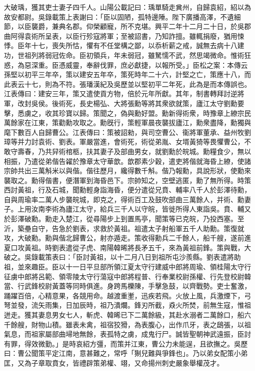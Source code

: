 \begin{pinyinscope}
大破瑀，獲其吏士妻子四千人。山陽公載記曰：瑀單騎走兾州，自歸袁紹，紹以為故安都尉。吳錄載策上表謝曰：「臣以固陋，孤特邊陲。陛下廣播高澤，不遺細節，以臣襲爵，兼典名郡。仰榮顧寵，所不克堪。興平二年十二月二十日，於吳郡曲阿得袁術所呈表，以臣行殄寇將軍；至被詔書，乃知詐擅。雖輒捐廢，猶用悚悸。臣年十七，喪失所怙，懼有不任堂構之鄙，以忝析薪之戒，誠無去病十八建功，世祖列將弱冠佐命。臣初領兵，年未弱冠，雖駑懦不武，然思竭微命。惟術狂惑，為惡深重。臣憑威靈，奉辭伐罪，庶必獻捷，以報所受。」臣松之案：本傳云孫堅以初平三年卒，策以建安五年卒，策死時年二十六，計堅之亡，策應十八，而此表云十七，則為不符。張璠漢紀及吳歷並以堅初平二年死，此為是而本傳誤也。江表傳曰：建安三年，策又遣使貢方物，倍於元年所獻。其年，制書轉拜討逆將軍，改封吳侯。後術死，長史楊弘、大將張勳等將其衆欲就策，廬江太守劉勳要擊，悉虜之，收其珍寶以歸。策聞之，偽與勳好盟。勳新得術衆，時豫章上繚宗民萬餘家在江東，策勸勳攻取之。勳旣行，策輕軍晨夜襲拔廬江，勳衆盡降，勳獨與麾下數百人自歸曹公。江表傳曰：策被詔勑，與司空曹公、衞將軍董承、益州牧劉璋等并力討袁術、劉表。軍嚴當進，會術死，術從弟胤、女壻黃猗等畏懼曹公，不敢守壽春，乃共舁術棺柩，扶其妻子及部曲男女，就劉勳於皖城。勳糧食少，無以相振，乃遣從弟偕告糴於豫章太守華歆。歆郡素少穀，遣吏將偕就海昏上繚，使諸宗帥共出三萬斛米以與偕。偕往歷月，纔得數千斛。偕乃報勳，具說形狀，使勳來襲取之。勳得偕書，便潛軍到海昏邑下。宗帥知之，空壁逃匿，勳了無所得。時策西討黃祖，行及石城，聞勳輕身詣海昏，便分遣從兄賁、輔率八千人於彭澤待勳，自與周瑜率二萬人步襲皖城，即克之，得術百工及鼓吹部曲三萬餘人，并術、勳妻子。上用汝南李術為廬江太守，給兵三千人以守皖，皆徙所得人東詣吳。賁、輔又於彭澤破勳。勳走入楚江，從尋陽步上到置馬亭，聞策等已克皖，乃投西塞。至沂，築壘自守，告急於劉表，求救於黃祖。祖遣太子射船軍五千人助勳。策復就攻，大破勳。勳與偕北歸曹公，射亦遁走。策收得勳兵二千餘人，船千艘，遂前進夏口攻黃祖。時劉表遣從子虎、南陽韓晞將長矛五千，來為黃祖前鋒。策與戰，大破之。吳錄載策表曰：「臣討黃祖，以十二月八日到祖所屯沙羨縣。劉表遣將助祖，並來趣臣。臣以十一日平旦部所領江夏太守行建威中郎將周瑜、領桂陽太守行征虜中郎將呂範、領零陵太守行蕩寇中郎將程普、行奉業校尉孫權、行先登校尉韓當、行武鋒校尉黃蓋等同時俱進。身跨馬櫟陳，手擊急鼓，以齊戰勢。吏士奮激，踊躍百倍，心精意果，各競用命。越渡重壍，迅疾若飛。火放上風，兵激煙下，弓弩並發，流矢雨集，日加辰時，祖乃潰爛。鋒刃所截，猋火所焚，前無生寇，惟祖迸走。獲其妻息男女七人，斬虎、韓晞已下二萬餘級，其赴水溺者二萬餘口，船六千餘艘，財物山積。雖表未禽，祖宿狡猾，為表腹心，出作爪牙，表之鴟張，以祖氣息，而祖家屬部曲埽地無餘，表孤特之虜，成鬼行尸。誠皆聖朝神武遠振，臣討有罪，得效微勤。」是時哀紹方彊，而策并江東，曹公力未能逞，且欲撫之。吳歷曰：曹公聞策平定江南，意甚難之，常呼「猘兒難與爭鋒也」。乃以弟女配策小弟匡，又為子章取賁女，皆禮辟策弟權、翊，又命揚州刺史嚴象舉權茂才。


\end{pinyinscope}
